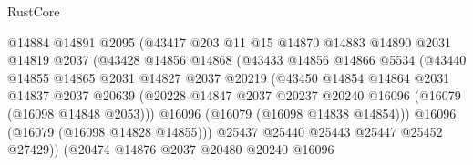 \begin{lexlean}{RustCore}
\begin{coremodule}
                                @14884
                                @14891
                                @2095
                                (@43417
                                  @203
                                  @11
                                  @15
                                  @14870
                                  @14883
                                  @14890
                                  @2031
                                  @14819
                                  @2037
                                  (@43428
                                    @14856
                                    @14868
                                    (@43433
                                      @14856
                                      @14866
                                      @5534
                                      (@43440
                                        @14855
                                        @14865
                                        @2031
                                        @14827
                                        @2037
                                        @20219
                                        (@43450
                                          @14854
                                          @14864
                                          @2031
                                          @14837
                                          @2037
                                          @20639
                                          (@20228
                                            @14847
                                            @2037
                                            @20237
                                            @20240
                                            @16096
                                            (@16079 (@16098 @14848 @2053)))
                                          @16096
                                          (@16079 (@16098 @14838 @14854)))
                                        @16096
                                        (@16079 (@16098 @14828 @14855)))
                                      @25437
                                      @25440
                                      @25443
                                      @25447
                                      @25452
                                      @27429))
                                  (@20474
                                    @14876
                                    @2037
                                    @20480
                                    @20240
                                    @16096

\end{coremodule}
\end{lexlean}
